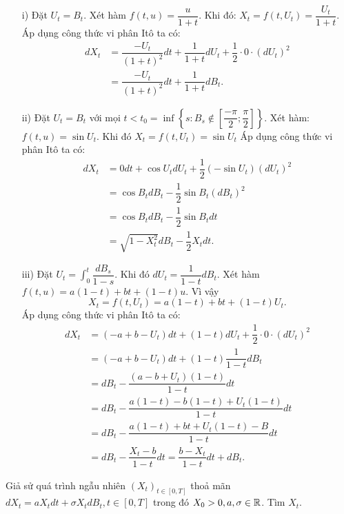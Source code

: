\begin{sol*}
    \begin{itemize}
        \item[i)] Đặt $U_t = B_t$. Xét hàm $f(t,u) = \dfrac{u}{1+t}$. Khi đó: $X_t = f(t,U_t) = \dfrac{U_t}{1+t}$. Áp dụng công thức vi phân Itô ta có:
        \begin{align*}
            dX_t &= \dfrac{-U_t}{(1+t)^2}dt + \dfrac{1}{1+t}dU_t + \dfrac{1}{2} \cdot 0 \cdot (dU_t)^2 \\
            &= \dfrac{-U_t}{(1+t)^2}dt + \dfrac{1}{1+t}dB_t.
        \end{align*} 
        \item[ii)] Đặt $U_t = B_t$ với mọi $t < t_0 = \inf \left\{s: B_s \notin \left[\dfrac{-\pi}{2} ; \dfrac{\pi}{2} \right]  \right\}$. Xét hàm: $f(t,u) = \sin  U_t$. Khi đó $X_t = f(t,U_t)= \sin  U_t$ Áp dụng công thức vi phân Itô ta có:
        \begin{align*}
            dX_t &= 0dt + \cos U_t dU_t + \dfrac{1}{2}(-\sin U_t)(dU_t)^2\\
            &= \cos B_t dB_t - \dfrac{1}{2}\sin B_t (dB_t)^2\\
            &= \cos B_t dB_t - \dfrac{1}{2}\sin B_t dt\\
            &= \sqrt{1-X_t^2} dB_t -\dfrac{1}{2}X_tdt.
        \end{align*}
        \item[iii)] Đặt $U_t = \displaystyle \int_0^t \dfrac{dB_s}{1-s}$. Khi đó $dU_t = \dfrac{1}{1-t}dB_t$. Xét hàm $f(t,u) = a(1-t)+bt+(1-t)u$. Vì vậy \[X_t = f(t,U_t)=a(1-t)+bt+(1-t)U_t.\] Áp dụng công thức vi phân Itô ta có:
        \begin{align*}
            dX_t &= (-a+b-U_t)dt +(1-t)dU_t+ \dfrac{1}{2} \cdot 0 \cdot (dU_t)^2\\
            &= (-a+b-U_t)dt +(1-t)\dfrac{1}{1-t}dB_t\\
            &= dB_t - \dfrac{(a-b+U_t)(1-t)}{1-t} dt\\
            &=  dB_t - \dfrac{a(1-t)-b(1-t)+U_t(1-t)}{1-t} dt\\
            &= dB_t - \dfrac{a(1-t)+bt+U_t(1-t)-B}{1-t} dt\\
            &= dB_t - \dfrac{X_t-b}{1-t}dt = \dfrac{b-X_t}{1-t}dt + dB_t.     
        \end{align*}
    \end{itemize}
\end{sol*}
\begin{exam*}
    Giả sử quá trình ngẫu nhiên $(X_t)_{t \in [0,T]}$ thoả mãn $dX_t = aX_tdt + \sigma X_t dB_t, t \in [0,T]$ trong đó $X_0>0,a, \sigma \in \mathbb{R}$. Tìm $X_t$.
\end{exam*}
